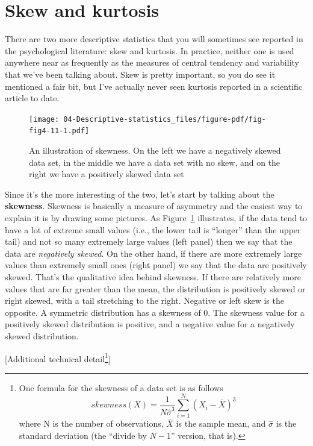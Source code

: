 \documentclass[
  a4paper,
]{book}
\begin{document}
\hypertarget{skew-and-kurtosis}{%
\section{Skew and kurtosis}\label{skew-and-kurtosis}}

There are two more descriptive statistics that you will sometimes see
reported in the psychological literature: skew and kurtosis. In
practice, neither one is used anywhere near as frequently as the
measures of central tendency and variability that we've been talking
about. Skew is pretty important, so you do see it mentioned a fair bit,
but I've actually never seen kurtosis reported in a scientific article
to date.

\begin{figure}

\texttt{[image: 04-Descriptive-statistics\_files/figure-pdf/fig-fig4-11-1.pdf]} \hfill{}

\caption{\label{fig-fig4-11}An illustration of skewness. On the left we
have a negatively skewed data set, in the middle we have a data set with
no skew, and on the right we have a positively skewed data set}

\end{figure}

Since it's the more interesting of the two, let's start by talking about
the \textbf{skewness}. Skewness is basically a measure of asymmetry and
the easiest way to explain it is by drawing some pictures. As
Figure~\ref{fig-fig4-11} illustrates, if the data tend to have a lot of
extreme small values (i.e., the lower tail is ``longer'' than the upper
tail) and not so many extremely large values (left panel) then we say
that the data are \emph{negatively skewed}. On the other hand, if there
are more extremely large values than extremely small ones (right panel)
we say that the data are positively skewed. That's the qualitative idea
behind skewness. If there are relatively more values that are far
greater than the mean, the distribution is positively skewed or right
skewed, with a tail stretching to the right. Negative or left skew is
the opposite. A symmetric distribution has a skewness of 0. The skewness
value for a positively skewed distribution is positive, and a negative
value for a negatively skewed distribution.

{[}Additional technical detail\footnote{One formula for the skewness of
  a data set is as follows
  \[skewness(X)=\frac{1}{N \hat{\sigma}^3} \sum_{i=1}^{N} ( X_i - \bar{X})^3\]
  where N is the number of observations, \(\bar{X}\) is the sample mean,
  and \(\hat{\sigma}\) is the standard deviation (the ``divide by
  \(N - 1\)'' version, that is).}{]}
\end{document}
